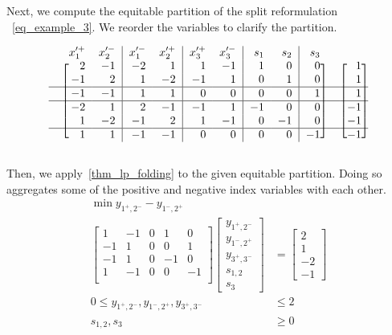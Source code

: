 \documentclass[pdflatex,sn-mathphys-num]{sn-jnl}%
\theoremstyle{thmstyleone}%
\theoremstyle{thmstylethree}%
\theoremstyle{thmstyletwo}%
\begin{document}
Next, we compute the equitable partition of the split reformulation ~\eqref{eq_example_3}. We reorder the variables to clarify the partition.

\begin{equation*}
   \begin{blockarray}{rrr|rr|rr|rr|rrr}
    & x'^+_1 & x'^-_2 & x'^-_1 & x'^+_2 & x'^+_3 & x'^-_3 & s_1 & s_2 & s_3 & & \\
\begin{block}{c[rr|rr|rr|rr|r]r[r]}
  & 2 & -1 & -2 & 1 & 1 & -1 & 1 & 0 & 0 & & 1\\
  & -1 & 2 & 1 & -2 & -1 & 1 & 0 & 1 & 0 & & 1 \\
  \BAhline
  & -1 & -1 & 1 & 1 & 0 & 0 & 0 & 0 & 1 & & 1\\
  \BAhline
  & -2 & 1 & 2 & -1 & -1 & 1 & -1 & 0 & 0 & & -1\\
  & 1 & -2 & -1 & 2 & 1 & -1 & 0 & -1 & 0 & & -1 \\
  \BAhline
  & 1 & 1 &  -1 & -1 & 0 & 0 & 0 & 0 & -1 & & -1\\
\end{block}
\end{blockarray} 
\end{equation*}

Then, we apply~\cref{thm_lp_folding} to the given equitable partition. Doing so aggregates some of the positive and negative index variables with each other.
\begin{subequations}
\label{eq_example_4}
\begin{align}
    \min y_{1^+,2^-} - y_{1^-,2^+} & \\
    \begin{bmatrix}
        1 & -1 & 0 & 1 & 0 \\
        -1 & 1 & 0 & 0 & 1\\
        -1 & 1 & 0 & -1 & 0\\
        1 & -1 & 0 & 0 & -1\\
    \end{bmatrix} \begin{bmatrix}
        y_{1^+,2^-}\\
        y_{1^-,2^+} \\
        y_{3^+,3^-} \\
        s_{1,2}\\
        s_3
    \end{bmatrix} &= \begin{bmatrix}
        2 \\
        1\\
        -2\\
        -1
    \end{bmatrix}\\
    0 \leq y_{1^+,2^-}, y_{1^-,2^+}, y_{3^+,3^-}&\leq 2 \\
    s_{1,2}, s_3 &\geq 0\\
\end{align}    
\end{subequations}
\end{document}
